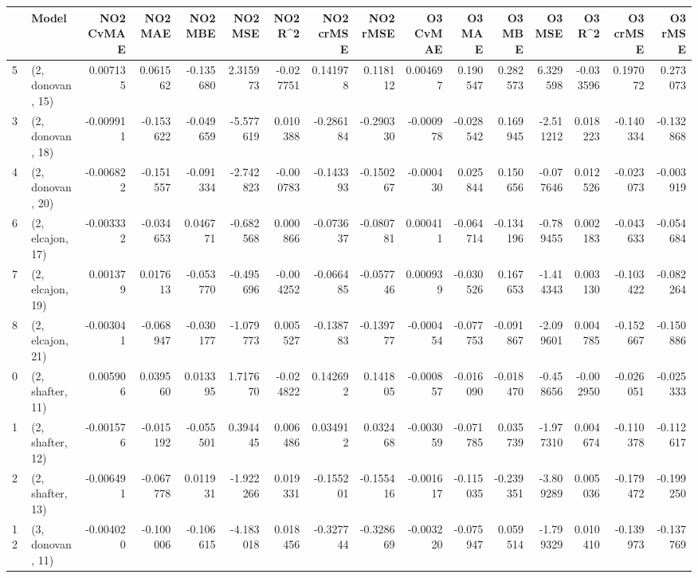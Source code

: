 \begin{tabular}{llrrrrrrrrrrrrrr}
\toprule
{} &             Model &  NO2 CvMAE &   NO2 MAE &   NO2 MBE &    NO2 MSE &   NO2 R\textasciicircum2 &  NO2 crMSE &  NO2 rMSE &  O3 CvMAE &    O3 MAE &    O3 MBE &     O3 MSE &    O3 R\textasciicircum2 &  O3 crMSE &   O3 rMSE \\
\midrule
5  &  (2, donovan, 15) &   0.007135 &  0.061562 & -0.135680 &   2.315973 & -0.027751 &   0.141978 &  0.118112 &  0.004697 &  0.190547 &  0.282573 &   6.329598 & -0.033596 &  0.197072 &  0.273073 \\
3  &  (2, donovan, 18) &  -0.009911 & -0.153622 & -0.049659 &  -5.577619 &  0.010388 &  -0.286184 & -0.290330 & -0.000978 & -0.028542 &  0.169945 &  -2.511212 &  0.018223 & -0.140334 & -0.132868 \\
4  &  (2, donovan, 20) &  -0.006822 & -0.151557 & -0.091334 &  -2.742823 & -0.000783 &  -0.143393 & -0.150267 & -0.000430 &  0.025844 &  0.150656 &  -0.077646 &  0.012526 & -0.023073 & -0.003919 \\
6  &  (2, elcajon, 17) &  -0.003332 & -0.034653 &  0.046771 &  -0.682568 &  0.000866 &  -0.073637 & -0.080781 &  0.000411 & -0.064714 & -0.134196 &  -0.789455 &  0.002183 & -0.043633 & -0.054684 \\
7  &  (2, elcajon, 19) &   0.001379 &  0.017613 & -0.053770 &  -0.495696 & -0.004252 &  -0.066485 & -0.057746 &  0.000939 & -0.030526 &  0.167653 &  -1.414343 &  0.003130 & -0.103422 & -0.082264 \\
8  &  (2, elcajon, 21) &  -0.003041 & -0.068947 & -0.030177 &  -1.079773 &  0.005527 &  -0.138783 & -0.139777 & -0.000454 & -0.077753 & -0.091867 &  -2.099601 &  0.004785 & -0.152667 & -0.150886 \\
0  &  (2, shafter, 11) &   0.005906 &  0.039560 &  0.013395 &   1.717670 & -0.024822 &   0.142692 &  0.141805 & -0.000857 & -0.016090 & -0.018470 &  -0.458656 & -0.002950 & -0.026051 & -0.025333 \\
1  &  (2, shafter, 12) &  -0.001576 & -0.015192 & -0.055501 &   0.394445 &  0.006486 &   0.034912 &  0.032468 & -0.003059 & -0.071785 &  0.035739 &  -1.977310 &  0.004674 & -0.110378 & -0.112617 \\
2  &  (2, shafter, 13) &  -0.006491 & -0.067778 &  0.011931 &  -1.922266 &  0.019331 &  -0.155201 & -0.155416 & -0.001617 & -0.115035 & -0.239351 &  -3.809289 &  0.005036 & -0.179472 & -0.199250 \\
12 &  (3, donovan, 11) &  -0.004020 & -0.100006 & -0.106615 &  -4.183018 &  0.018456 &  -0.327744 & -0.328669 & -0.003220 & -0.075947 &  0.059514 &  -1.799329 &  0.010410 & -0.139973 & -0.137769 \\

\end{tabular}
